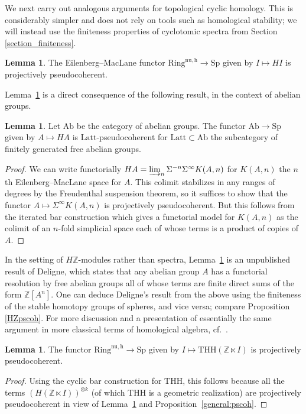 \documentclass{amsart}
\newcommand{\THH}{\mathrm{THH}}
\newcommand{\Sp}{\mathrm{Sp}}
\theoremstyle{definition}
\newtheorem{lemma}[definition]{Lemma}
\newcommand{\nuzh}{\mathrm{Ring}^{\mathrm{nu,h}}}
\begin{document}
We next carry out analogous arguments for topological cyclic homology. 
This is considerably simpler and does not rely on tools such as homological
stability; we will instead use the finiteness properties of cyclotomic spectra from Section \ref{section_finiteness}.
 
\begin{lemma} 
The Eilenberg--MacLane functor $\nuzh \to \Sp$ given by $I \mapsto HI$ is projectively pseudocoherent. 
\label{EMpscoh}
\end{lemma} 

Lemma~\ref{EMpscoh} is a direct consequence of the following result, in the
context of abelian groups. 

\begin{lemma} 
\label{Abpscoh}
Let $\mathrm{Ab}$ be the category of abelian groups. 
The functor $\mathrm{Ab} \to \Sp$ given by $A \mapsto HA$ is
$\mathrm{Latt}$-pseudocoherent for $\mathrm{Latt} \subset \mathrm{Ab}$ the
subcategory of finitely generated free abelian groups. 
\end{lemma} 
\begin{proof} 


We can write functorially $HA = \varinjlim_n \Sigma^{-n}\Sigma^\infty  K(A, n)$
for $K(A, n)$ the $n$th Eilenberg--MacLane space for $A$. 
This colimit stabilizes in any ranges of degrees by the Freudenthal suspension
theorem, so it suffices to show that the functor 
$A \mapsto \Sigma^\infty K(A, n)$ is projectively pseudocoherent. But this
follows from the iterated bar construction which gives a functorial model for
$K(A, n)$ as the colimit of an $n$-fold simplicial space each of whose terms is
a product of copies of $A$. 
\end{proof} 


 In the setting of $H\mathbb{Z}$-modules rather than
spectra, 
Lemma~\ref{Abpscoh}
is an unpublished result of Deligne, which states that any abelian group $A$ has a
functorial resolution by free abelian groups all of whose terms are finite direct sums of the
form $\mathbb{Z}[A^n]$. One can deduce Deligne's result from the
above using the finiteness of the stable homotopy groups of spheres, and vice
versa; compare Proposition \ref{HZpscoh}. 
For more discussion and a presentation of essentially the same argument in more classical terms of homological algebra, cf.~\cite[Appendix to
Lec.~IV]{Condensed}. 

\begin{lemma} 
\label{THHps}
The functor $\nuzh \to \Sp$ given by $I \mapsto \THH( \mathbb{Z} \ltimes I)$ is
projectively pseudocoherent.
\end{lemma} 
\begin{proof} 
Using the cyclic bar construction for $\THH$, this follows because all the terms
$(H(\mathbb{Z} \ltimes I))^{\otimes k}$ (of which $\THH$ is a geometric
realization) are projectively pseudocoherent in view of Lemma~\ref{EMpscoh}
and Proposition~\ref{general:pscoh}.
\end{proof} 
\end{document}
